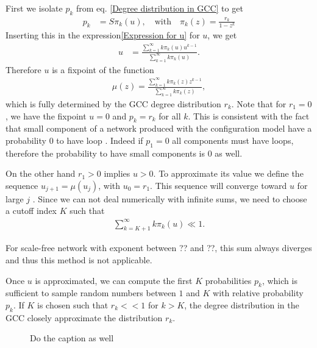 \documentclass[a4paper]{article}
\begin{document}
First we isolate $p_k$ from eq. \eqref{Degree distribution in GCC} to get
\begin{align}
	p_k &= S \pi_k(u), \quad \text{with} \quad \pi_k(z) = \frac{r_k}{1 - z^k}
\end{align}
Inserting this in the expression\eqref{Expression for u} for $u$, we get
\begin{align}
	u &= \frac{\sum_{k=1}^\infty k \pi_k(u) u^{k-1}}{\sum_{k=1}^\infty k \pi_k(u)}.
\end{align}
Therefore $u$ is a fixpoint of the function
\begin{align}
	\mu(z) = \frac{\sum_{k=1}^\infty k \pi_k(z) z^{k-1}}{\sum_{k=1}^\infty k \pi_k(z)}, \label{Defition of mu}
\end{align}
which is fully determined by the GCC degree distribution $r_k$. Note that for $r_1 = 0$, we have the fixpoint $u = 0$ and $p_k = r_k$ for all $k$. This is consistent with the fact that small component of a network produced with the configuration model have a probability $0$ to have loop \cite{newman2010networks}. Indeed if $p_1 = 0$ all components must have loops, therefore the probability to have small components is $0$ as well.


On the other hand $r_1 > 0$ implies $u > 0$. To approximate its value we define the sequence $u_{j+1} = \mu(u_j)$, with $u_0 = r_1$. This sequence will converge toward $u$ for large $j$ . Since we can not deal numerically with infinite sums, we need to choose a cutoff index $K$ such that
\begin{align}
	\sum_{k=K+1}^\infty k \pi_k(u) \ll 1.
\end{align}

For scale-free network with exponent between ?? and ??, this sum always diverges and thus this method is not applicable.

Once $u$ is approximated, we can compute the first $K$ probabilities $p_k$, which is sufficient to sample random numbers between $1$ and $K$ with relative probability $p_k$. If $K$ is chosen such that $r_k << 1$ for $k > K$, the degree distribution in the GCC closely approximate the distribution $r_k$.

\begin{figure}
	 \caption{Do the caption as well}
\end{figure}

\end{document}
